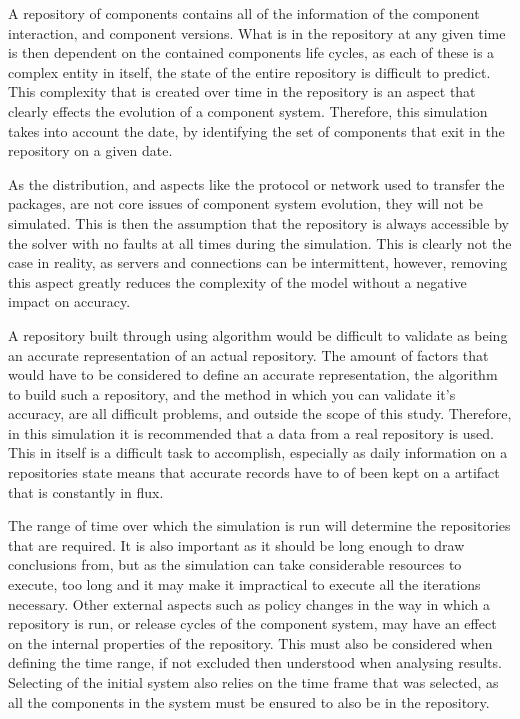 A repository of components contains all of the information of the component interaction, and component versions.
What is in the repository at any given time is then dependent on the contained components life cycles,
as each of these is a complex entity in itself, the state of the entire repository is difficult to predict.
This complexity that is created over time in the repository is an aspect that clearly effects the evolution of a component system.
Therefore, this simulation takes into account the date, by identifying the set of components that exit in the repository on a given date.

As the distribution, and aspects like the protocol or network used to transfer the packages, are not core issues of component system evolution,
they will not be simulated.
This is then the assumption that the repository is always accessible by the solver with no faults at all times during the simulation.
This is clearly not the case in reality, as servers and connections can be intermittent,
however, removing this aspect greatly reduces the complexity of the model without a negative impact on accuracy. 

A repository built through using algorithm would be difficult to validate as being an accurate representation of an actual repository.
The amount of factors that would have to be considered to define an accurate representation, the algorithm to build such a repository,
and the method in which you can validate it's accuracy,
are all difficult problems, and outside the scope of this study. 
Therefore, in this simulation it is recommended that a data from a real repository is used.
This in itself is a difficult task to accomplish, especially as daily information on a repositories state means that accurate records have to of been kept on a artifact that is constantly in flux.

The range of time over which the simulation is run will determine the repositories that are required.
It is also important as it should be long enough to draw conclusions from,
but as the simulation can take considerable resources to execute, too long and it may make it impractical to execute all the iterations necessary.
Other external aspects such as policy changes in the way in which a repository is run, or release cycles of the component system, 
may have an effect on the internal properties of the repository.
This must also be considered when defining the time range, if not excluded then understood when analysing results.
Selecting of the initial system also relies on the time frame that was selected,
as all the components in the system must be ensured to also be in the repository.

